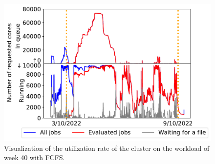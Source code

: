 \documentclass[sigconf,review,anonymous]{acmart}
\begin{document}
\begin{figure}[t]\centering\includegraphics[width=0.9\linewidth]{../MBSS/plot/Cluster_usage/2022-10-03->2022-10-09_V10000_anonymous_Fcfs_Used_nodes_450_128_32_256_4_1024_core_by_core.pdf}\caption{Visualization of the utilization rate of the cluster on the workload of week 40 with FCFS.}\label{40_cluster_usage_fcfs}\end{figure}
\end{document}
